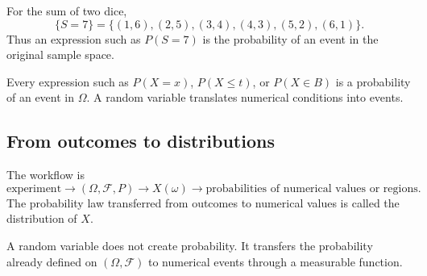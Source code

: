For the sum of two dice,
\[
\{S=7\}=\{(1,6),(2,5),(3,4),(4,3),(5,2),(6,1)\}.
\]
Thus an expression such as \(P(S=7)\) is the probability of an event in the
original sample space.

\begin{remarkbox}
Every expression such as \(P(X=x)\), \(P(X\leq t)\), or \(P(X\in B)\) is a
probability of an event in \(\Omega\). A random variable translates numerical
conditions into events.
\end{remarkbox}

\subsection*{From outcomes to distributions}

The workflow is
\[
\text{experiment}
\longrightarrow
(\Omega,\mathcal F,P)
\longrightarrow
X(\omega)
\longrightarrow
\text{probabilities of numerical values or regions}.
\]
The probability law transferred from outcomes to numerical values is called the
distribution of \(X\).

\begin{theorembox}
A random variable does not create probability. It transfers the probability
already defined on \((\Omega,\mathcal F)\) to numerical events through a
measurable function.
\end{theorembox}
